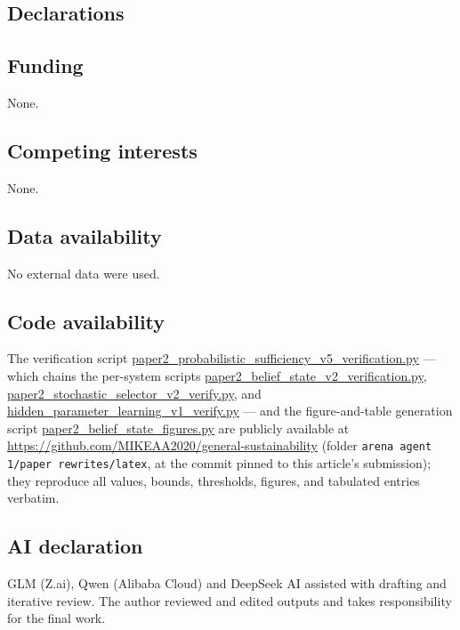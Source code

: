\documentclass[10pt,twocolumn]{article}
\theoremstyle{plain}
\theoremstyle{definition}
\theoremstyle{remark}
\begin{document}
\subsection*{Declarations}

\subsection*{Funding}
None.

\subsection*{Competing interests}
None.

\subsection*{Data availability}
No external data were used.

\subsection*{Code availability}
The verification script
\url{paper2_probabilistic_sufficiency_v5_verification.py} --- which chains
the per-system scripts \url{paper2_belief_state_v2_verification.py},
\url{paper2_stochastic_selector_v2_verify.py}, and
\url{hidden_parameter_learning_v1_verify.py} --- and the figure-and-table
generation script \url{paper2_belief_state_figures.py} are publicly
available at \url{https://github.com/MIKEAA2020/general-sustainability}
(folder \texttt{arena agent 1/paper rewrites/latex}, at the commit
pinned to this article's submission); they reproduce all values, bounds,
thresholds, figures, and tabulated entries verbatim.

\subsection*{AI declaration}
GLM (Z.ai), Qwen (Alibaba Cloud) and DeepSeek AI assisted with drafting
and iterative review. The author reviewed and edited outputs and takes
responsibility for the final work.
\end{document}
